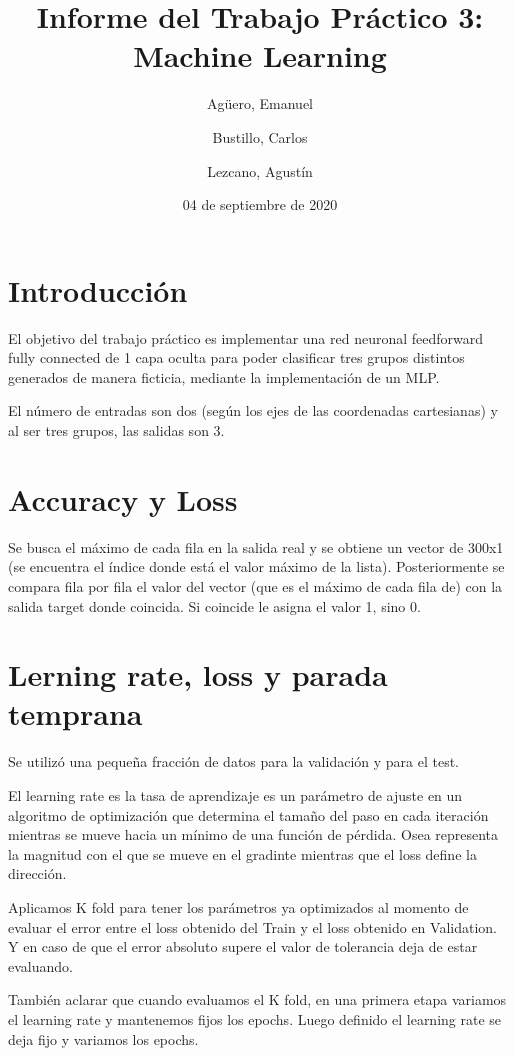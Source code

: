 \documentclass{article}
\title{Informe del Trabajo Práctico 3: Machine Learning}
\author{Agüero, Emanuel\\
\and
Bustillo, Carlos\\
\and
Lezcano, Agustín\\
}
\date{04 de septiembre de 2020}
\begin{document}
\maketitle

\section{Introducción}

El objetivo del trabajo práctico es implementar una  red neuronal feedforward fully connected de 1 capa oculta
para poder clasificar tres grupos distintos generados de manera ficticia, mediante la implementación de un MLP. 

El número de entradas son dos (según los ejes de las coordenadas cartesianas) y al ser tres grupos, las salidas son  3.

\section{Accuracy y Loss}
Se busca el máximo de cada fila en la salida real y  se obtiene un vector de 300x1 (se encuentra el índice donde está el valor máximo de la lista). Posteriormente se compara fila por fila el valor del vector (que es el máximo de cada fila de) con la salida target donde coincida. Si coincide le asigna el valor 1, sino 0.

\section{Lerning rate, loss y parada temprana}
Se utilizó una pequeña fracción de datos para la validación y para el test.

El learning rate es la tasa de aprendizaje es un parámetro de ajuste en un algoritmo de optimización que determina el tamaño del paso en cada iteración mientras se mueve hacia un mínimo de una función de pérdida. Osea representa la magnitud con el que se mueve en el gradinte mientras que el loss define la dirección.

Aplicamos K fold para tener los parámetros ya optimizados al momento de evaluar el error entre el loss obtenido del Train y el loss obtenido en Validation. Y en caso de que el error absoluto supere el valor de tolerancia deja de estar evaluando. 

También aclarar que cuando evaluamos el K fold, en una primera etapa variamos el learning rate y mantenemos fijos los epochs. Luego definido el learning rate se deja fijo y variamos los epochs.
\end{document}
